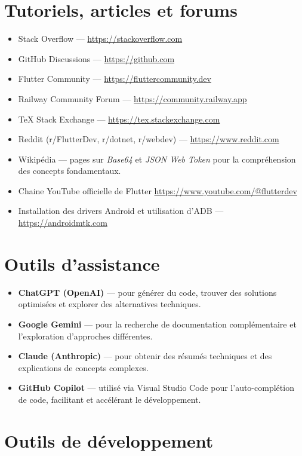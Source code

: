 \documentclass[12pt]{report}
\begin{document}
	\section{Tutoriels, articles et forums}
	
	\begin{itemize}
		\item Stack Overflow — \url{https://stackoverflow.com}
		\item GitHub Discussions — \url{https://github.com}
		\item Flutter Community — \url{https://fluttercommunity.dev}
		\item Railway Community Forum — \url{https://community.railway.app}
		\item TeX Stack Exchange — \url{https://tex.stackexchange.com}
		\item Reddit (r/FlutterDev, r/dotnet, r/webdev) — \url{https://www.reddit.com}
		\item Wikipédia — pages sur \textit{Base64} et \textit{JSON Web Token} pour la compréhension des concepts fondamentaux.
		\item Chaine YouTube officielle de Flutter \url{https://www.youtube.com/@flutterdev}
		\item Installation des drivers Android et utilisation d’ADB — \url{https://androidmtk.com}
	\end{itemize}
	
	\section{Outils d’assistance}
	
	\begin{itemize}
		\item \textbf{ChatGPT (OpenAI)} — pour générer du code, trouver des solutions optimisées et explorer des alternatives techniques.
		\item \textbf{Google Gemini} — pour la recherche de documentation complémentaire et l’exploration d’approches différentes.
		\item \textbf{Claude (Anthropic)} — pour obtenir des résumés techniques et des explications de concepts complexes.
		\item \textbf{GitHub Copilot} — utilisé via Visual Studio Code pour l’auto-complétion de code, facilitant et accélérant le développement.
	\end{itemize}
	
	
	\section{Outils de développement}
	
\end{document}
